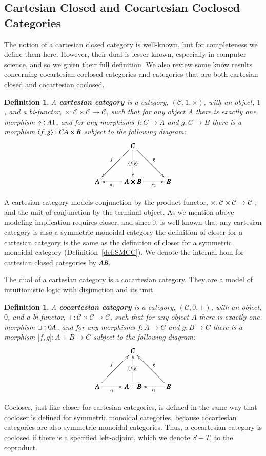 \documentclass{lmcs}
\newtheorem{definition}[theorem]{Definition}
\let\mto\to
\let\to\relax
\newcommand{\to}{\rightarrow}
\newcommand{\cat}[1]{\mathcal{#1}}
\begin{document}
\subsection{Cartesian Closed and Cocartesian Coclosed Categories}
\label{subsec:cartesian_closed_and_cocartesian_coclosed_categories}
The notion of a cartesian closed category is well-known, but for
completeness we define them here.  However, their dual is lesser
known, especially in computer science, and so we given their full
definition.  We also review some know results concerning cocartesian
coclosed categories and categories that are both cartesian closed and
cocartesian coclosed.
\begin{definition}
  \label{def:CC}
  A \textbf{cartesian category} is a category, $(\cat{C}, 1, \times)$,
  with an object, $1$, and a bi-functor, $\times : \cat{C} \times
  \cat{C} \mto \cat{C}$, such that for any object $A$ there is exactly
  one morphism $\diamond : A \to 1$, and for any morphisms $f : C \mto
  A$ and $g : C \mto B$ there is a morphism $\langle f , g \rangle : C
  \to A \times B$ subject to the following diagram:
  \[
  \bfig
  \Atrianglepair/->`->`->`<-`->/[C`A`A\times B`B;
    f`
    \langle f , g \rangle`
    g`
    \pi_1`
    \pi_2]
  \efig
  \]
\end{definition}
A cartesian category models conjunction by the product functor,
$\times : \cat{C} \times \cat{C} \mto \cat{C}$ , and the unit of
conjunction by the terminal object.  As we mention above modeling
implication requires closer, and since it is well-known that any
cartesian category is also a symmetric monoidal category the
definition of closer for a cartesian category is the same as the
definition of closer for a symmetric monoidal category
(Definition~\ref{def:SMCC}).  We denote the internal hom for cartesian
closed categories by $A \to B$.

The dual of a cartesian category is a cocartesian category.  They are
a model of intuitionistic logic with disjunction and its unit.
\begin{definition}
  \label{def:CC}
  A \textbf{cocartesian category} is a category, $(\cat{C}, 0, +)$,
  with an object, $0$, and a bi-functor,
  $+ : \cat{C} \times \cat{C} \mto \cat{C}$, such that for any object $A$ there is exactly
  one morphism $\Box : 0 \to A$, and for any morphisms $f : A \mto C$ and $g : B \mto C$
  there is a morphism $\lbrack f , g \rbrack : A + B \mto C$
  subject to the following diagram:
  \[
  \bfig
  \Atrianglepair/<-`<-`<-`->`<-/[C`A`A+B`B;
    f`
    \lbrack f, g \rbrack`
    g`
    \iota_1`
    \iota_2]
  \efig
  \]  
\end{definition}
Cocloser, just like closer for cartesian categories, is defined in
the same way that cocloser is defined for symmetric monoidal
categories, because cocartesian categories are also symmetric
monoidal categories.  Thus, a cocartesian category is coclosed if
there is a specified left-adjoint, which we denote $S - T$, to the
coproduct.
\end{document}

